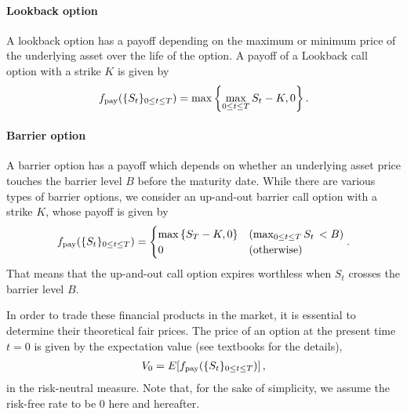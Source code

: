 {\paragraph*{Lookback option} A lookback option has a payoff depending on the maximum or minimum price of the underlying asset over the life of the option.
A payoff of a Lookback call option with a strike $K$ is given by 
\begin{align}
    f_{\rm pay}(\{S_t\}_{0 \leq t \leq T}) = \max \left\{ \max_{0 \leq t \leq T} S_t - K , 0 \right\}.
\end{align}

\paragraph*{Barrier option} 
A barrier option has a payoff which depends on whether an underlying asset price touches the barrier level $B$ before the maturity date.
While there are various types of barrier options, we consider an up-and-out barrier call option with a strike $K$, whose payoff is given by 
\begin{align}
    f_{\rm pay}(\{S_t\}_{0 \leq t \leq T}) =
    \begin{cases}
    \max \left\{S_T - K,0  \right\}& (\max_{0 \leq t \leq T} S_t  \,  < B  )\\
        0 & (\mathrm{otherwise})
    \end{cases}.
\end{align}
That means that the up-and-out call option expires worthless when $S_t$ crosses the barrier level $B$. 

In order to trade these financial products in the market, it is essential to determine their theoretical fair prices.
The price of an option at the present time $t=0$ is given by the expectation value (see textbooks \cite{hull1993options,shreve2005stochastic,shreve2004stochastic} for the details),
\begin{align}
    V_0 = E[f_{\rm pay}(\{S_t\}_{0 \leq t \leq T})] \, ,
    \label{eq:OpPrice}
\end{align}
in the risk-neutral measure. Note that, for the sake of simplicity, we assume the risk-free rate to be 0 here and hereafter.

}
